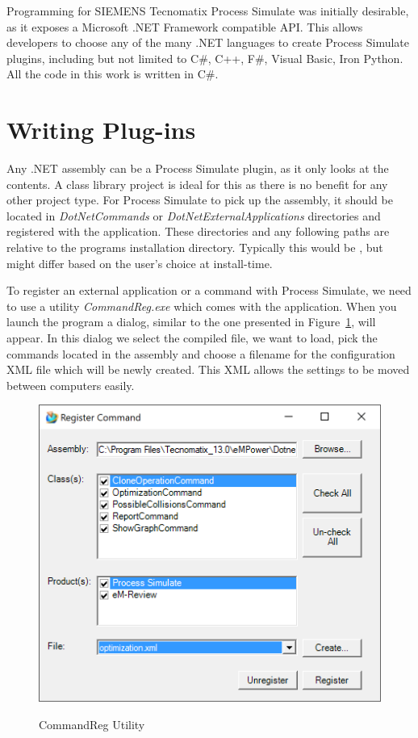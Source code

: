 Programming for SIEMENS Tecnomatix Process Simulate was initially desirable, as it exposes a Microsoft .NET Framework compatible API. This allows developers to choose any of the many .NET languages to create Process Simulate plugins, including but not limited to C\#, C++, F\#, Visual Basic, Iron Python. All the code in this work is written in C\#.

\section{Writing Plug-ins}
Any .NET assembly can be a Process Simulate plugin, as it only looks at the contents. 
A class library project is ideal for this as there is no benefit for any other project type. 
For Process Simulate to pick up the assembly, it should be located in \emph{DotNetCommands} or \emph{DotNetExternalApplications} directories and registered with the application. 
These directories and any following paths are relative to the programs installation directory. 
Typically this would be , but might differ based on the user's choice at install-time.

To register an external application or a command with Process Simulate, we need to use a utility \emph{CommandReg.exe} which comes with the application. When you launch the program a dialog, similar to the one presented in Figure~\ref{fig:CommandReg}, will appear. In this dialog we select the compiled file, we want to load, pick the commands located in the assembly and choose a filename for the configuration XML file which will be newly created. This XML allows the settings to be moved between computers easily. \\

\begin{figure}[H]
    \caption{CommandReg Utility}
    \centering
    \includegraphics{commandreg}
    \label{fig:CommandReg}
\end{figure}

